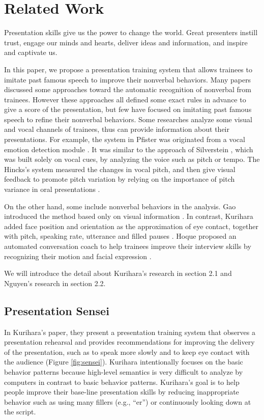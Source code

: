 \chapter[Related Work]{Related Work}
\par Presentation skills give us the power to change the world. Great presenters instill trust, engage our minds and hearts, deliver ideas and information, and inspire and captivate us.

\par In this paper, we propose a presentation training system that allows trainees to imitate past famous speech to improve their nonverbal behaviors. Many papers discussed some approaches toward the automatic recognition of nonverbal from trainees. However these approaches all defined some exact rules in advance to give a score of the presentation, but few have focused on imitating past famous speech to refine their nonverbal behaviors. Some researches analyze some visual and vocal channels of trainees, thus can provide information about their presentations. For example, the system in Pfister was originated from a vocal emotion detection module \cite{pfister2011real}. It was similar to the approach of Silverstein \cite{Silverstein2006}, which was built solely on vocal cues, by analyzing the voice such as pitch or tempo. The Hincks's system measured the changes in vocal pitch, and then give visual feedback to promote pitch variation by relying on the importance of pitch variance in oral presentations \cite{hincks2009promoting}.
\par On the other hand, some include nonverbal behaviors in the analysis. Gao introduced the method based only on visual information \cite{Gao}. In contrast, Kurihara added face position and orientation as the approximation of eye contact, together with pitch, speaking rate, utterance and filled pauses \cite{Kurihara2007}. Hoque proposed an automated conversation coach to help trainees improve their interview skills by recognizing their motion and facial expression \cite{Kurihara2007}.
\par We will introduce the detail about Kurihara's research \cite{Kurihara2007} in section 2.1 and Nguyen's research \cite{nguyen2015intelligent} in section 2.2. 

\section{Presentation Sensei}
\label{sensei}
\par In Kurihara's paper, they present a presentation training system that observes a presentation rehearsal and provides recommendations for improving the delivery of the presentation, such as to speak more slowly and to keep eye contact with the audience (Figure \ref{fig:sensei}). Kurihara intentionally focuses on the basic behavior patterns because high-level semantics is very difficult to analyze by computers in contrast to basic behavior patterns. Kurihara's goal is to help people improve their base-line presentation skills by reducing inappropriate behavior such as using many fillers (e.g., “er”) or continuously looking down at the script.

